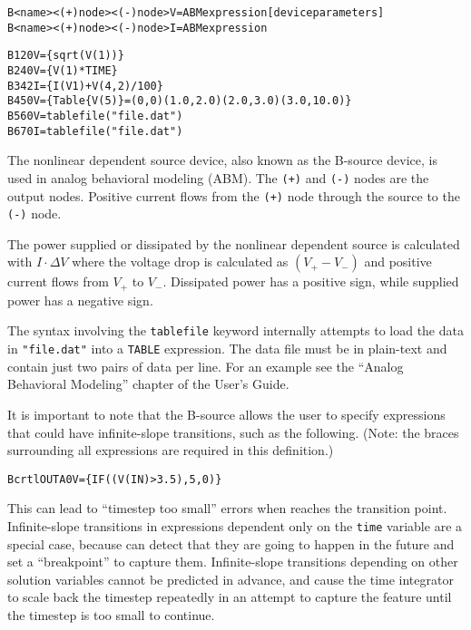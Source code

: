 


\begin{Device}\label{B_DEVICE}

\device
\begin{alltt}
B<name> <(+) node> <(-) node> V={ABM expression} [device parameters]
B<name> <(+) node> <(-) node> I={ABM expression}
\end{alltt}

\examples
\begin{alltt}
B1 2 0 V=\{sqrt(V(1))\}
B2 4 0 V=\{V(1)*TIME\}
B3 4 2 I=\{I(V1) + V(4,2)/100\}
B4 5 0 V=\{Table \{V(5)\}=(0,0) (1.0,2.0) (2.0,3.0) (3.0,10.0)\}
B5 6 0 V=tablefile("file.dat")
B6 7 0 I=tablefile("file.dat")
\end{alltt}

\comments

The nonlinear dependent source device, also known as the B-source
device, is used in analog behavioral modeling (ABM).  The \texttt{(+)}
and \texttt{(-)} nodes are the output nodes. Positive current flows from
the \texttt{(+)} node through the source to the \texttt{(-)}
node. 

The power supplied or dissipated by the nonlinear dependent source is calculated 
with $I \cdot \Delta V$ where the voltage drop is calculated as $(V_+ - V_-)$ 
and positive current flows from $V_+$ to $V_-$.  Dissipated power has a
positive sign, while supplied power has a negative sign.

The syntax involving the \texttt{tablefile} keyword internally attempts to load the
data in \texttt{"file.dat"} into a \texttt{TABLE} expression.  The data file must
be in plain-text and contain just two pairs of data per line.  For an example see 
the ``Analog Behavioral Modeling'' chapter of the \Xyce{} User's
Guide.

It is important to note that the B-source allows the user to specify
expressions that could have infinite-slope transitions, such as the
following.  (Note: the braces surrounding all expressions are required in this definition.)
\begin{alltt} Bcrtl OUTA 0 V=\{ IF( (V(IN) > 3.5), 5, 0 ) \} \end{alltt}
This can lead to ``timestep too small'' errors when \Xyce{} reaches the
transition point.  Infinite-slope transitions in expressions dependent only on
the \texttt{time} variable are a special case, because \Xyce{} can detect that
they are going to happen in the future and set a ``breakpoint'' to capture
them.  Infinite-slope transitions depending on other solution variables cannot
be predicted in advance, and cause the time integrator to scale back the
timestep repeatedly in an attempt to capture the feature until the timestep is
too small to continue.


\end{Device}
